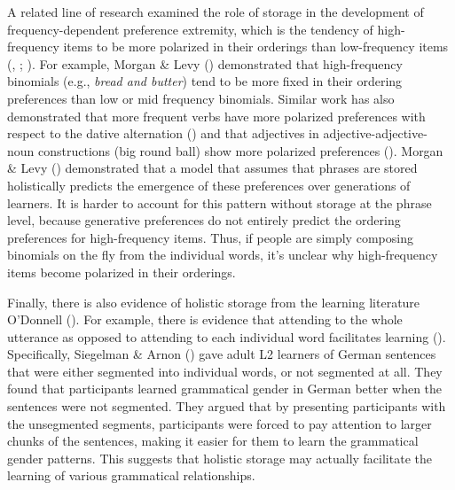 \documentclass[
  12pt,
  letterpaper,
]{scrreport}
\begin{document}
A related line of research examined the role of storage in the
development of frequency-dependent preference extremity, which is the
tendency of high-frequency items to be more polarized in their orderings
than low-frequency items
(,
;
). For example, Morgan \& Levy
()
demonstrated that high-frequency binomials (e.g., \emph{bread and
butter}) tend to be more fixed in their ordering preferences than low or
mid frequency binomials. Similar work has also demonstrated that more
frequent verbs have more polarized preferences with respect to the
dative alternation
() and that adjectives in adjective-adjective-noun
constructions (big round ball) show more polarized preferences
(). Morgan \& Levy
()
demonstrated that a model that assumes that phrases are stored
holistically predicts the emergence of these preferences over
generations of learners. It is harder to account for this pattern
without storage at the phrase level, because generative preferences do
not entirely predict the ordering preferences for high-frequency items.
Thus, if people are simply composing binomials on the fly from the
individual words, it's unclear why high-frequency items become polarized
in their orderings.

Finally, there is also evidence of holistic storage from the learning
literature O'Donnell
(). For
example, there is evidence that attending to the whole utterance as
opposed to attending to each individual word facilitates learning
(). Specifically, Siegelman \& Arnon
() gave adult L2
learners of German sentences that were either segmented into individual
words, or not segmented at all. They found that participants learned
grammatical gender in German better when the sentences were not
segmented. They argued that by presenting participants with the
unsegmented segments, participants were forced to pay attention to
larger chunks of the sentences, making it easier for them to learn the
grammatical gender patterns. This suggests that holistic storage may
actually facilitate the learning of various grammatical relationships.
\end{document}
